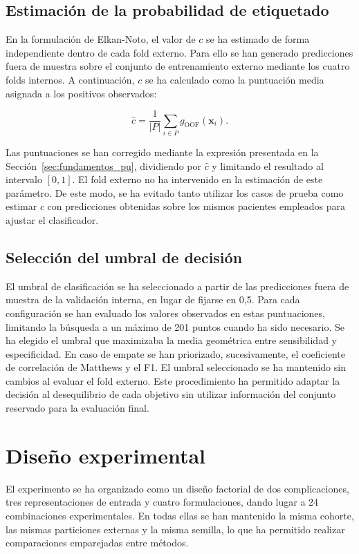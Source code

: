 \subsection{Estimación de la probabilidad de etiquetado}

En la formulación de Elkan-Noto, el valor de \(c\) se ha estimado de forma independiente dentro de cada fold externo. Para ello se han generado predicciones fuera de muestra sobre el conjunto de entrenamiento externo mediante los cuatro folds internos. A continuación, \(c\) se ha calculado como la puntuación media asignada a los positivos observados:

\[
\hat{c}
=
\frac{1}{|P|}
\sum_{i\in P} g_{\mathrm{OOF}}(\mathbf{x}_i).
\]

Las puntuaciones se han corregido mediante la expresión presentada en la Sección~\ref{sec:fundamentos_pu}, dividiendo por \(\hat{c}\) y limitando el resultado al intervalo \([0,1]\). El fold externo no ha intervenido en la estimación de este parámetro. De este modo, se ha evitado tanto utilizar los casos de prueba como estimar \(c\) con predicciones obtenidas sobre los mismos pacientes empleados para ajustar el clasificador.

\subsection{Selección del umbral de decisión}

El umbral de clasificación se ha seleccionado a partir de las predicciones fuera de muestra de la validación interna, en lugar de fijarse en 0,5. Para cada configuración se han evaluado los valores observados en estas puntuaciones, limitando la búsqueda a un máximo de 201 puntos cuando ha sido necesario. Se ha elegido el umbral que maximizaba la media geométrica entre sensibilidad y especificidad. En caso de empate se han priorizado, sucesivamente, el coeficiente de correlación de Matthews y el F1. El umbral seleccionado se ha mantenido sin cambios al evaluar el fold externo. Este procedimiento ha permitido adaptar la decisión al desequilibrio de cada objetivo sin utilizar información del conjunto reservado para la evaluación final.

\section{Diseño experimental}

El experimento se ha organizado como un diseño factorial de dos complicaciones, tres representaciones de entrada y cuatro formulaciones, dando lugar a 24 combinaciones experimentales. En todas ellas se han mantenido la misma cohorte, las mismas particiones externas y la misma semilla, lo que ha permitido realizar comparaciones emparejadas entre métodos.

